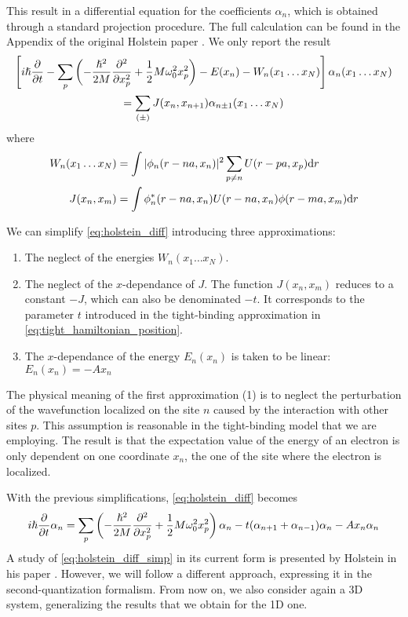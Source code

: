 This result in a differential equation for the coefficients $\alpha_n$, which is obtained through a standard projection procedure. The full calculation can be found in the Appendix of the original Holstein paper \cite{holstein1959}. We only report the result
\begin{multline} \label{eq:holstein_diff}
    \left[ i\hslash \pdv{}{t} - \sum_p \left( -\frac{\hslash^2}{2M} \pdv[2]{}{x_p} + \frac{1}{2} M \omega_0^2 x_p^2 \right) - E(x_n) - W_n(x_1\dots x_N) \right] \alpha_n(x_1\dots x_N)
    \\= \sum_{(\pm)} J(x_n, x_{n+1}) \alpha_{n\pm1}(x_1\dots x_N)
\end{multline}
where
\begin{align}
    W_n(x_1 \dots x_N) & = \int |\phi_n(r-na, x_n)|^2  \sum_{p \neq n} U(r-pa, x_p)  \differential r \\
    J(x_n, x_m)        & = \int \phi_n^*(r-na, x_n) U(r-na, x_n) \phi(r-ma, x_m) \differential r
\end{align}

We can simplify \cref{eq:holstein_diff} introducing three approximations:
\begin{enumerate}
    \item The neglect of the energies $ W_n(x_1 \dots x_N)$.
    \item The neglect of the $x$-dependance of $J$. The function $J(x_n, x_m)$ reduces to a constant $-J$, which can also be denominated $-t$. It corresponds to the parameter $t$ introduced in the tight-binding approximation in \cref{eq:tight_hamiltonian_position}.
    \item The $x$-dependance of the energy $E_n(x_n)$ is taken to be linear: $    E_n(x_n) = - A x_n$
\end{enumerate}
The physical meaning of the first approximation (1) is to neglect the perturbation of the wavefunction localized on the site $n$ caused by the interaction with other sites $p$. This assumption is reasonable in the tight-binding model that we are employing. The result is that the expectation value of the energy of an electron is only dependent on one coordinate $x_n$, the one of the site where the electron is localized.

With the previous simplifications, \cref{eq:holstein_diff} becomes
\begin{equation} \label{eq:holstein_diff_simp}
    i\hslash\pdv{}{t} \alpha_n = \sum_p\left( -\frac{\hslash^2}{2M} \pdv[2]{}{x_p} + \frac{1}{2} M \omega_0^2 x_p^2 \right) \alpha_n - t (\alpha_{n+1}+\alpha_{n-1})\alpha_n
    - A x_n \alpha_n
\end{equation}
A study of \cref{eq:holstein_diff_simp} in its current form is presented by Holstein in his paper \cite{holstein1959}. However, we will follow a different approach, expressing it in the second-quantization formalism. From now on, we also consider again a 3D system, generalizing the results that we obtain for the 1D one.

